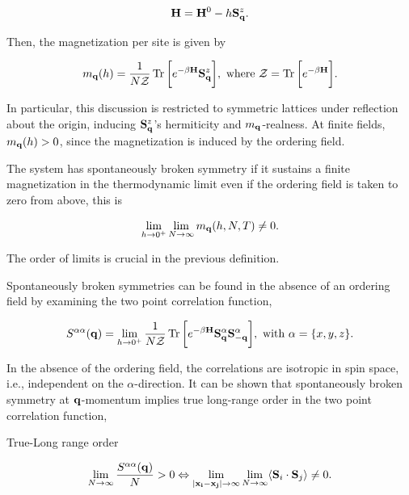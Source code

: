 \documentclass{homework}
\begin{document}
\begin{equation}
    {\bf H} = {\bf H}^0 - h {{\bf S}}_{{\bf q}}^z. 
\end{equation}

Then, the magnetization per site is given by 

$$
    m_{{\bf q}}(h) = \frac{1}{N \mathcal{Z}} \Tr \bigg[e^{- \beta {\bf H}} {{\bf S}}_{{\bf q}}^z\bigg], \textnormal{ where } \mathcal{Z} = \Tr \bigg[e^{- \beta {\bf H}} \bigg].
$$

In particular, this discussion is restricted to symmetric lattices under reflection about the origin, inducing ${{\bf S}}_{{\bf q}}^z$'s hermiticity and $m_{{\bf q}}$-realness. At finite fields, $m_{{\bf q}}(h) > 0$, since the magnetization is induced by the ordering field. \\

\begin{df}
The system has spontaneously broken symmetry if it sustains a finite magnetization in the thermodynamic limit even if the ordering field is taken to zero from above, this is 

$$ 
   \lim_{h \rightarrow 0^+} \lim_{N \rightarrow \infty} m_{{\bf q}}(h, N, T) \neq 0.
$$

The order of limits is crucial in the previous definition. 
\end{df}

Spontaneously broken symmetries can be found in the absence of an ordering field by examining the two point correlation function,

$$
    S^{\alpha \alpha}({\bf q}) = \lim_{h \rightarrow 0^+} \frac{1}{N\mathcal{Z}} \Tr \bigg[e^{- \beta {\bf H}} {{\bf S}}_{{\bf q}}^\alpha {{\bf S}}_{{\bf -q}}^\alpha\bigg], \textnormal{ with } \alpha = \{x,y,z\}.
$$

In the absence of the ordering field, the correlations are isotropic in spin space, i.e., independent on the $\alpha$-direction. It can be shown that spontaneously broken symmetry at ${\bf q}$-momentum implies true long-range order in the two point correlation function,

\begin{df} True-Long range order

$$
    \lim_{N \rightarrow \infty} \frac{S^{\alpha \alpha} ({\bf q})}{N} > 0 \Leftrightarrow \lim_{|{\bf x_i - x_j}| \rightarrow \infty} \lim_{N \rightarrow \infty} \langle {\bf S}_i \cdot {\bf S}_j \rangle \neq 0.  
$$

\end{df}
\end{document}
